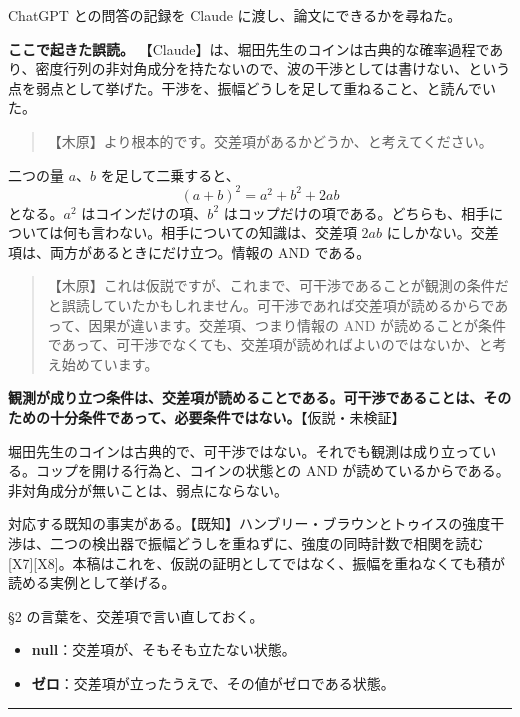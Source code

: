 \documentclass[
  a4paper,
]{ltjsarticle}
\providecommand{\tightlist}{%
  \setlength{\itemsep}{0pt}\setlength{\parskip}{0pt}}
\begin{document}
ChatGPT との問答の記録を Claude に渡し、論文にできるかを尋ねた。

\textbf{ここで起きた誤読。}
【Claude】は、堀田先生のコインは古典的な確率過程であり、密度行列の非対角成分を持たないので、波の干渉としては書けない、という点を弱点として挙げた。干渉を、振幅どうしを足して重ねること、と読んでいた。

\begin{quote}
【木原】より根本的です。交差項があるかどうか、と考えてください。
\end{quote}

二つの量 \(a\)、\(b\) を足して二乗すると、 \[
(a+b)^2 = a^2 + b^2 + 2ab \tag{9.1}
\] となる。\(a^2\) はコインだけの項、\(b^2\)
はコップだけの項である。どちらも、相手については何も言わない。相手についての知識は、交差項
\(2ab\) にしかない。交差項は、両方があるときにだけ立つ。情報の AND
である。

\begin{quote}
【木原】これは仮説ですが、これまで、可干渉であることが観測の条件だと誤読していたかもしれません。可干渉であれば交差項が読めるからであって、因果が違います。交差項、つまり情報の
AND
が読めることが条件であって、可干渉でなくても、交差項が読めればよいのではないか、と考え始めています。
\end{quote}

\textbf{観測が成り立つ条件は、交差項が読めることである。可干渉であることは、そのための十分条件であって、必要条件ではない。}【仮説・未検証】

堀田先生のコインは古典的で、可干渉ではない。それでも観測は成り立っている。コップを開ける行為と、コインの状態との
AND が読めているからである。非対角成分が無いことは、弱点にならない。

対応する既知の事実がある。【既知】ハンブリー・ブラウンとトゥイスの強度干渉は、二つの検出器で振幅どうしを重ねずに、強度の同時計数で相関を読む
{[}X7{]}{[}X8{]}。本稿はこれを、仮説の証明としてではなく、振幅を重ねなくても積が読める実例として挙げる。

§2 の言葉を、交差項で言い直しておく。

\begin{itemize}
\tightlist
\item
  \textbf{null}：交差項が、そもそも立たない状態。
\item
  \textbf{ゼロ}：交差項が立ったうえで、その値がゼロである状態。
\end{itemize}

\begin{center}\rule{0.5\linewidth}{0.5pt}\end{center}
\end{document}
